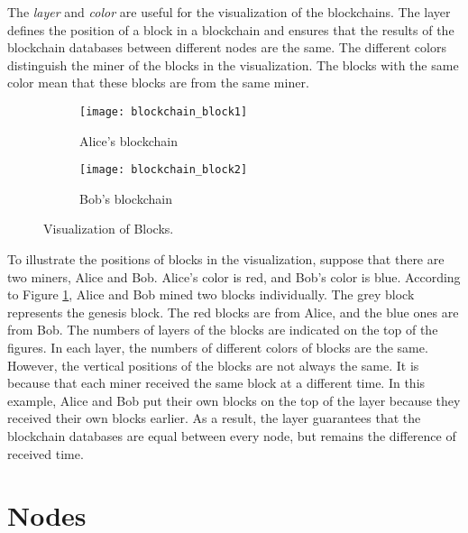 The \textit{layer} and \textit{color} are useful for the visualization of the blockchains. The layer defines the position of a block in a blockchain and ensures that the results of the blockchain databases between different nodes are the same. The different colors distinguish the miner of the blocks in the visualization. The blocks with the same color mean that these blocks are from the same miner.

\begin{figure}[htb]
    \centering
    \begin{subfigure}[b]{0.4\textwidth}
        \centering
        \texttt{[image: blockchain\_block1]}
        \caption{Alice's blockchain}
    \end{subfigure}
    \hfill
    \begin{subfigure}[b]{0.4\textwidth}
        \centering
        \texttt{[image: blockchain\_block2]}
        \caption{Bob's blockchain}
    \end{subfigure}

    \caption{Visualization of Blocks.}
    \label{fig:visualization of blocks}
\end{figure}

To illustrate the positions of blocks in the visualization, suppose that there are two miners, Alice and Bob. Alice's color is red, and Bob's color is blue. According to Figure \ref{fig:visualization of blocks}, Alice and Bob mined two blocks individually. The grey block represents the genesis block. The red blocks are from Alice, and the blue ones are from Bob. The numbers of layers of the blocks are indicated on the top of the figures. In each layer, the numbers of different colors of blocks are the same. However, the vertical positions of the blocks are not always the same. It is because that each miner received the same block at a different time. In this example, Alice and Bob put their own blocks on the top of the layer because they received their own blocks earlier. As a result, the layer guarantees that the blockchain databases are equal between every node, but remains the difference of received time.

\section{Nodes}

